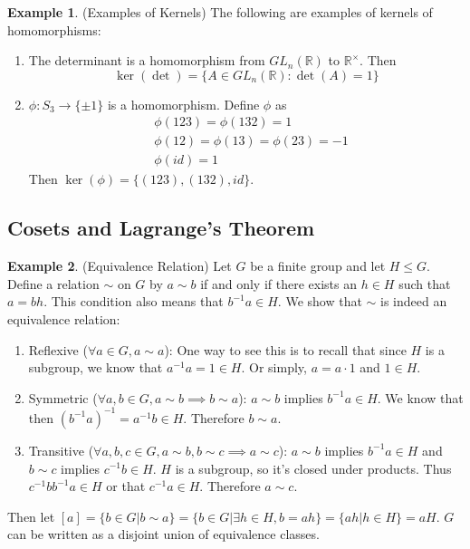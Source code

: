 \documentclass[12pt]{article}
\theoremstyle{definition}
\newtheorem{example}{Example}
\theoremstyle{definition}
\newcommand{\R}{\mathbb{R}}
\begin{document}
\begin{example}(Examples of Kernels)
The following are examples of kernels of homomorphisms:
\begin{enumerate}
	\item The determinant is a homomorphism from $GL_n(\mathbb{R})$ to $\R^{\times}$. Then
	\begin{equation}
		\ker(\det) = \{ A \in GL_n(\R) : \det(A) = 1 \}
	\end{equation}
	\item $\phi : S_3 \to \{\pm 1\}$ is a homomorphism. Define $\phi$ as 
	\begin{align*}
		&\phi(1 2 3) = \phi(1 3 2) = 1\\
		&\phi(1 2) = \phi(1 3) = \phi(2 3) = -1 \\
		&\phi(id) = 1
	\end{align*}
	Then $\ker(\phi) = \{(1 2 3), (1 3 2), id \}$.
\end{enumerate}
\end{example}

\subsection{Cosets and Lagrange's Theorem}
\begin{example}(Equivalence Relation)
Let $G$ be a finite group and let $H \leq G$. Define a relation $\sim$ on $G$ by $a \sim b$ if and only if there exists an $h \in H$ such that $a = bh$. This condition also means that $b^{-1}a \in H$. We show that $\sim$ is indeed an equivalence relation:
\begin{enumerate}
	\item Reflexive ($\forall a \in G, a \sim a$): One way to see this is to recall that since $H$ is a subgroup, we know that $a^{-1}a = 1 \in H$. Or simply, $a = a \cdot 1$ and $1 \in H$. 
	\item Symmetric ($\forall a,b \in G, a \sim b \implies b \sim a$): $a \sim b$ implies $b^{-1}a \in H$. We know that then $(b^{-1}a)^{-1} = a^{-1}b \in H$. Therefore $b \sim a$. 
	\item Transitive ($\forall a,b,c \in G, a \sim b, b\sim c \implies a \sim c$): $a \sim b$ implies $b^{-1}a \in H$ and $b \sim c$ implies $c^{-1}b \in H$. $H$ is a subgroup, so it's closed under products. Thus $c^{-1}bb^{-1}a \in H$ or that $c^{-1}a \in H$. Therefore $a \sim c$.
\end{enumerate}
Then let $[a] = \{ b \in G | b \sim a \} = \{b \in G | \exists h \in H, b = ah \} = \{ah | h \in H \} = aH$. $G$ can be written as a disjoint union of equivalence classes. 
\end{example}
\end{document}
